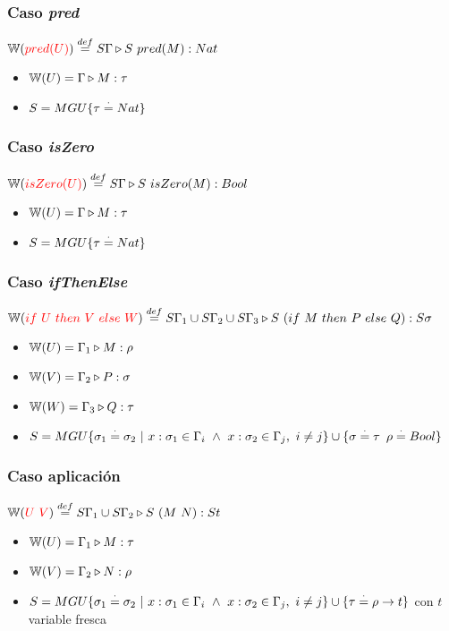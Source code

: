 \subsubsection{Caso \textit{pred}}
$\mathbb{W}({\color{red}pred(U)}) \overset{def}{=} S\Gamma\triangleright S~pred(M) : Nat$
\begin{centrado}
	\begin{itemize}
		\item $\mathbb{W}(U) = \Gamma\triangleright M : \tau$
		\item $S = MGU\{\tau\overset{\cdot}{=} Nat\}$
	\end{itemize}
\end{centrado}

\subsubsection{Caso \textit{isZero}}
$\mathbb{W}({\color{red}isZero(U)}) \overset{def}{=} S\Gamma\triangleright S~isZero(M) : Bool$
\begin{centrado}
	\begin{itemize}
		\item $\mathbb{W}(U) = \Gamma\triangleright M : \tau$
		\item $S = MGU\{\tau\overset{\cdot}{=} Nat\}$
	\end{itemize}
\end{centrado}

\subsubsection{Caso \textit{ifThenElse}}
$\mathbb{W}({\color{red}if~ U~ then~ V~ else~ W}) \overset{def}{=} S\Gamma_1\cup S\Gamma_2\cup S\Gamma_3\triangleright S~(if~ M~ then~ P~ else~ Q) : S\sigma$
\begin{centrado}
	\begin{itemize}
		\item $\mathbb{W}(U) = \Gamma_1\triangleright M : \rho$
		\item $\mathbb{W}(V) = \Gamma_2\triangleright P : \sigma$
		\item $\mathbb{W}(W) = \Gamma_3\triangleright Q : \tau$
		\item $S = MGU\{\sigma_1\overset{\cdot}{=} \sigma_2~|~x:\sigma_1\in\Gamma_i~\land~x:\sigma_2\in\Gamma_j,~i\neq j\}\cup\{\sigma\overset{\cdot}{=}\tau\,~\rho\overset{\cdot}{=} Bool\}$
	\end{itemize}
\end{centrado}

\subsubsection{Caso aplicación}
$\mathbb{W}({\color{red}U~V}) \overset{def}{=} S\Gamma_1\cup S\Gamma_2\triangleright S~(M~N) : St$
\begin{centrado}
	\begin{itemize}
		\item $\mathbb{W}(U) = \Gamma_1\triangleright M : \tau$
		\item $\mathbb{W}(V) = \Gamma_2\triangleright N : \rho$
		\item $S = MGU\{\sigma_1\overset{\cdot}{=} \sigma_2~|~x:\sigma_1\in\Gamma_i~\land~x:\sigma_2\in\Gamma_j,~i\neq j\}\cup\{\tau\overset{\cdot}{=}\rho\to t\}$ con $t$ variable fresca
	\end{itemize}
\end{centrado}

